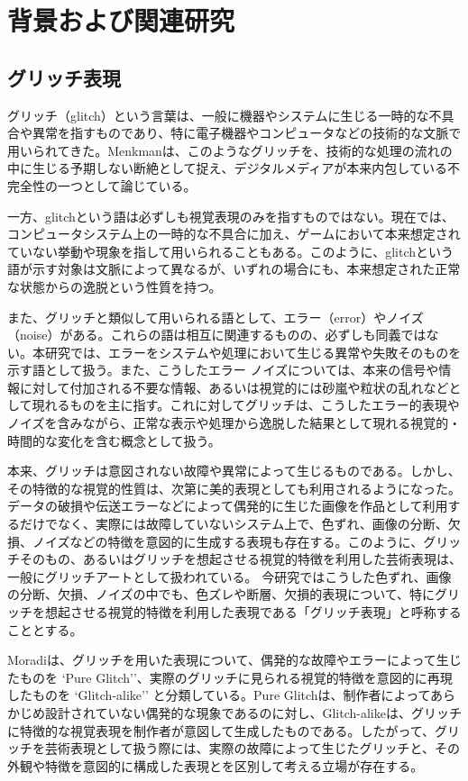 \chapter{背景および関連研究}

\section{グリッチ表現}

グリッチ（glitch）という言葉は、一般に機器やシステムに生じる一時的な不具合や異常を指すものであり、特に電子機器やコンピュータなどの技術的な文脈で用いられてきた。Menkmanは、このようなグリッチを、技術的な処理の流れの中に生じる予期しない断絶として捉え、デジタルメディアが本来内包している不完全性の一つとして論じている\cite{menkman2011}。

一方、glitchという語は必ずしも視覚表現のみを指すものではない。現在では、コンピュータシステム上の一時的な不具合に加え、ゲームにおいて本来想定されていない挙動や現象を指して用いられることもある。このように、glitchという語が示す対象は文脈によって異なるが、いずれの場合にも、本来想定された正常な状態からの逸脱という性質を持つ。

また、グリッチと類似して用いられる語として、エラー（error）やノイズ（noise）がある。これらの語は相互に関連するものの、必ずしも同義ではない。本研究では、エラーをシステムや処理において生じる異常や失敗そのものを示す語として扱う。また、こうしたエラー
ノイズについては、本来の信号や情報に対して付加される不要な情報、あるいは視覚的には砂嵐や粒状の乱れなどとして現れるものを主に指す。これに対してグリッチは、こうしたエラー的表現やノイズを含みながら、正常な表示や処理から逸脱した結果として現れる視覚的・時間的な変化を含む概念として扱う。

本来、グリッチは意図されない故障や異常によって生じるものである。しかし、その特徴的な視覚的性質は、次第に美的表現としても利用されるようになった。データの破損や伝送エラーなどによって偶発的に生じた画像を作品として利用するだけでなく、実際には故障していないシステム上で、色ずれ、画像の分断、欠損、ノイズなどの特徴を意図的に生成する表現も存在する。このように、グリッチそのもの、あるいはグリッチを想起させる視覚的特徴を利用した芸術表現は、一般にグリッチアートとして扱われている。
今研究ではこうした色ずれ、画像の分断、欠損、ノイズの中でも、色ズレや断層、欠損的表現について、特にグリッチを想起させる視覚的特徴を利用した表現である「グリッチ表現」と呼称することとする。

Moradiは、グリッチを用いた表現について、偶発的な故障やエラーによって生じたものを `Pure Glitch''、実際のグリッチに見られる視覚的特徴を意図的に再現したものを `Glitch-alike'' と分類している\cite{moradi2004}。Pure Glitchは、制作者によってあらかじめ設計されていない偶発的な現象であるのに対し、Glitch-alikeは、グリッチに特徴的な視覚表現を制作者が意図して生成したものである。したがって、グリッチを芸術表現として扱う際には、実際の故障によって生じたグリッチと、その外観や特徴を意図的に構成した表現とを区別して考える立場が存在する。

